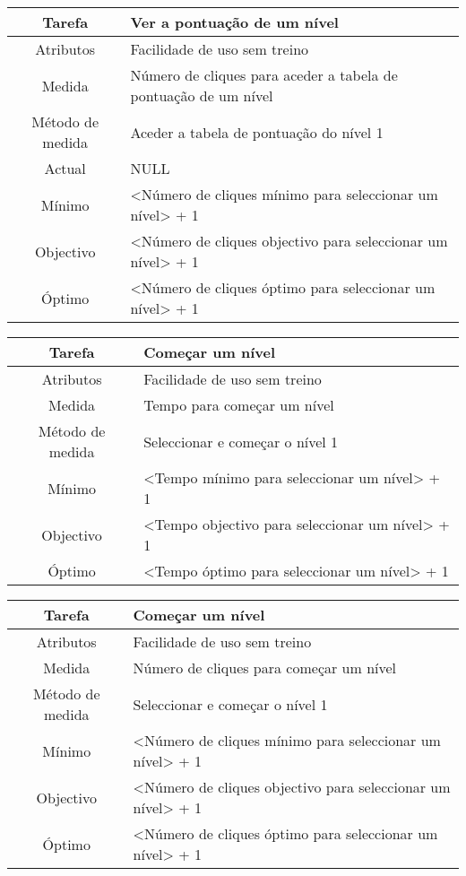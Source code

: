 \begin{center}
	\begin{tabular} {|c|p{10cm}|}
		\hline
		Tarefa & Ver a pontuação de um nível \\
		\hline
		Atributos & Facilidade de uso sem treino \\
		\hline
		Medida & Número de cliques para aceder a tabela de pontuação de um nível \\
		\hline
		Método de medida & Aceder a tabela de pontuação do nível 1 \\
		\hline
		Actual & NULL \\
		Mínimo & <Número de cliques mínimo para seleccionar um nível> + 1 \\
		Objectivo & <Número de cliques objectivo para seleccionar um nível> + 1 \\
		Óptimo & <Número de cliques óptimo para seleccionar um nível> + 1 \\
		\hline
	\end{tabular}
\end{center}

\begin{center}
	\begin{tabular} {|c|p{10cm}|}
		\hline
		Tarefa & Começar um nível \\
		\hline
		Atributos & Facilidade de uso sem treino \\
		\hline
		Medida & Tempo para começar um nível \\
		\hline
		Método de medida & Seleccionar e começar o nível 1 \\
		\hline
		Mínimo & <Tempo mínimo para seleccionar um nível> + 1 \\
		Objectivo & <Tempo objectivo para seleccionar um nível> + 1 \\
		Óptimo & <Tempo óptimo para seleccionar um nível> + 1 \\
		\hline
	\end{tabular}
\end{center}

\begin{center}
	\begin{tabular} {|c|p{10cm}|}
		\hline
		Tarefa & Começar um nível \\
		\hline
		Atributos & Facilidade de uso sem treino \\
		\hline
		Medida & Número de cliques para começar um nível \\
		\hline
		Método de medida & Seleccionar e começar o nível 1 \\
		\hline
		Mínimo & <Número de cliques mínimo para seleccionar um nível> + 1 \\
		Objectivo & <Número de cliques objectivo para seleccionar um nível> + 1 \\
		Óptimo & <Número de cliques óptimo para seleccionar um nível> + 1 \\
		\hline
	\end{tabular}
\end{center}

